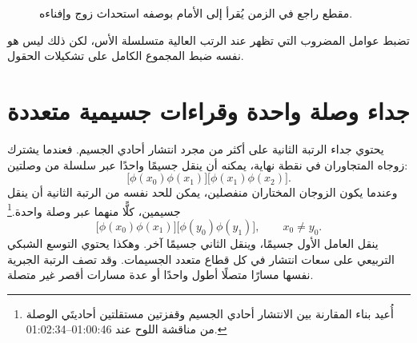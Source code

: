 \begin{figure}[htbp]
\centering
{}
\caption{مقطع راجع في الزمن يُقرأ إلى الأمام بوصفه استحداث زوج وإفناءه.}
\end{figure}

تضبط عوامل المضروب التي تظهر عند الرتب العالية متسلسلة الأس، لكن ذلك ليس هو نفسه ضبط المجموع الكامل على تشكيلات الحقول.

\begin{classroomqa}
\end{classroomqa}

\section{جداء وصلة واحدة وقراءات جسيمية متعددة}

يحتوي جداء الرتبة الثانية على أكثر من مجرد انتشار أحادي الجسيم. فعندما يشترك زوجاه المتجاوران في نقطة نهاية، يمكنه أن ينقل جسيمًا واحدًا عبر سلسلة من وصلتين:
\begin{equation}
\bigl[\phi(x_0)\phi(x_1)\bigr]
\bigl[\phi(x_1)\phi(x_2)\bigr].
\end{equation}
وعندما يكون الزوجان المختاران منفصلين، يمكن للحد نفسه من الرتبة الثانية أن ينقل جسيمين، كلًّا منهما عبر وصلة واحدة.\footnote{أُعيد بناء المقارنة بين الانتشار أحادي الجسيم وقفزتين مستقلتين أحاديتَي الوصلة من مناقشة اللوح عند 01:00:46--01:02:34.}
\begin{equation}
\bigl[\phi(x_0)\phi(x_1)\bigr]
\bigl[\phi(y_0)\phi(y_1)\bigr],
\qquad x_0\neq y_0.
\end{equation}
ينقل العامل الأول جسيمًا، وينقل الثاني جسيمًا آخر. وهكذا يحتوي التوسع الشبكي التربيعي على سعات انتشار في كل قطاع متعدد الجسيمات. وقد تصف الرتبة الجبرية نفسها مسارًا متصلًا أطول واحدًا أو عدة مسارات أقصر غير متصلة.

